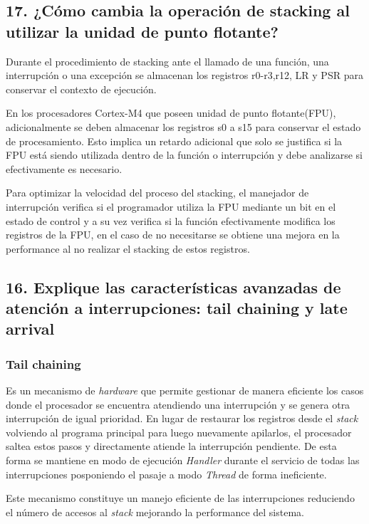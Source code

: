 \documentclass[10pt,a4paper,twoside,spanish]{article}	%
\begin{document}
\subsection*{17. ¿Cómo cambia la operación de stacking al utilizar la unidad de punto flotante?}

Durante el procedimiento de stacking ante el llamado de una función, una interrupción o una excepción se almacenan los registros r0-r3,r12, LR y PSR para conservar el contexto de ejecución.

En los procesadores Cortex-M4 que poseen unidad de punto flotante(FPU), adicionalmente se deben almacenar los registros s0 a s15 para conservar el estado de procesamiento. Esto implica un retardo adicional que solo se justifica si la FPU está siendo utilizada dentro de la función o interrupción y debe analizarse si efectivamente es necesario.

Para optimizar la velocidad del proceso del stacking, el manejador de interrupción verifica si el programador utiliza la FPU mediante un bit en el estado de control y a su vez verifica si la función efectivamente modifica los registros de la FPU, en el caso de no necesitarse se obtiene una mejora en la  performance al no realizar el stacking de estos registros. 

\subsection*{16. Explique las características avanzadas de atención a interrupciones: tail chaining y late arrival}

\subsubsection*{Tail chaining} Es un mecanismo de \textit{hardware} que permite gestionar de manera eficiente los casos donde el procesador se encuentra atendiendo una interrupción y se genera otra interrupción de igual prioridad.
En lugar de restaurar los registros desde el \textit{stack} volviendo al programa principal para luego nuevamente apilarlos, el procesador saltea estos pasos y directamente atiende la interrupción pendiente. De esta forma se mantiene en modo de ejecución \textit{Handler} durante el servicio de todas las interrupciones posponiendo el pasaje a modo \textit{Thread} de forma ineficiente.

Este mecanismo constituye un manejo eficiente de las interrupciones reduciendo el número de accesos al \textit{stack} mejorando la performance del sistema.
\end{document}

